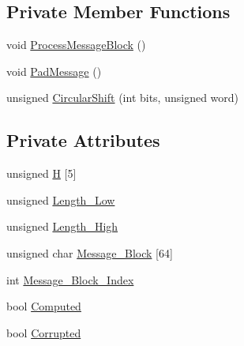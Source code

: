 \subsection*{\-Private \-Member \-Functions}
\begin{DoxyCompactItemize}
\item 
void \hyperlink{classSHA1_a960b6f6f156144b1bd52fb20cd3d513c}{\-Process\-Message\-Block} ()
\item 
void \hyperlink{classSHA1_a1acc2aff5b7b59f5f1d3f8b89b9463a9}{\-Pad\-Message} ()
\item 
unsigned \hyperlink{classSHA1_a9b0229cb55fe2476583e0d03286250cd}{\-Circular\-Shift} (int bits, unsigned word)
\end{DoxyCompactItemize}
\subsection*{\-Private \-Attributes}
\begin{DoxyCompactItemize}
\item 
unsigned \hyperlink{classSHA1_a8a1a57e7bb77225bdd6d49fd62612d50}{\-H} \mbox{[}5\mbox{]}
\item 
unsigned \hyperlink{classSHA1_afb5ee6b8e9b99eb73e7d9f41b030d801}{\-Length\-\_\-\-Low}
\item 
unsigned \hyperlink{classSHA1_a93956884da01c8a30acc5a0a2a274730}{\-Length\-\_\-\-High}
\item 
unsigned char \hyperlink{classSHA1_a94c8fabb04fabd4604503512a4cc56a5}{\-Message\-\_\-\-Block} \mbox{[}64\mbox{]}
\item 
int \hyperlink{classSHA1_a3046d0eca31827c928c35d123db86c53}{\-Message\-\_\-\-Block\-\_\-\-Index}
\item 
bool \hyperlink{classSHA1_ae96e54267ae36ea6f2ef91f3f8fc6130}{\-Computed}
\item 
bool \hyperlink{classSHA1_a6fde29947db3aa9ef8412b8f3d1bb739}{\-Corrupted}
\end{DoxyCompactItemize}


